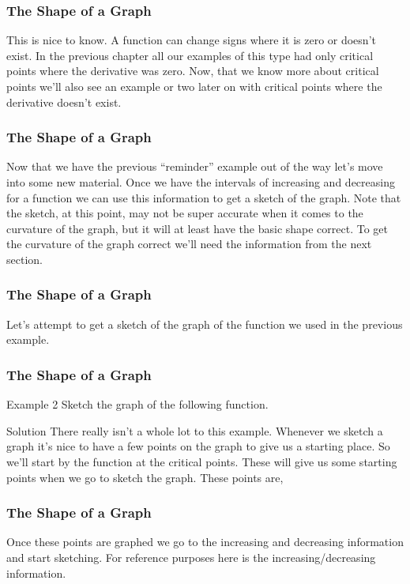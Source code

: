 \documentclass{beamer}
\begin{document}
\begin{frame} 
	\frametitle{The Shape of a Graph}
This is nice to know.  A function can change signs where it is zero or doesn’t exist.  In the previous chapter all our examples of this type had only critical points where the derivative was zero.  Now, that we know more about critical points we’ll also see an example or two later on with critical points where the derivative doesn’t exist.
\end{frame}
\begin{frame} 
	\frametitle{The Shape of a Graph}
Now that we have the previous “reminder” example out of the way let’s move into some new material.  Once we have the intervals of increasing and decreasing for a function we can use this information to get a sketch of the graph.  Note that the sketch, at this point, may not be super accurate when it comes to the curvature of the graph, but it will at least have the basic shape correct.  To get the curvature of the graph correct we’ll need the information from the next section.
\end{frame}
\begin{frame} 
	\frametitle{The Shape of a Graph}
Let’s attempt to get a sketch of the graph of the function we used in the previous example.
\end{frame}
\begin{frame} 
	\frametitle{The Shape of a Graph}
Example 2  Sketch the graph of the following function.

Solution
There really isn’t a whole lot to this example.  Whenever we sketch a graph it’s nice to have a few points on the graph to give us a starting place.  So we’ll start by the function at the critical points.  These will give us some starting points when we go to sketch the graph.  These points are,
\end{frame}
\begin{frame} 
	\frametitle{The Shape of a Graph}

Once these points are graphed we go to the increasing and decreasing information and start sketching.  For reference purposes here is the increasing/decreasing information.

\end{frame}
\end{document}
